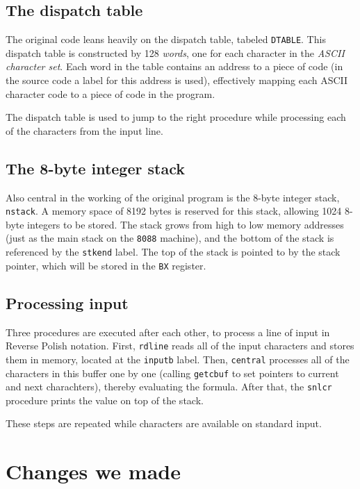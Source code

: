 \documentclass[11pt]{article}
\begin{document}
\subsection{The dispatch table}

The original code leans heavily on the dispatch table, tabeled \verb|DTABLE|. This dispatch table is constructed by 128 \emph{words}, one for each character in the \emph{ASCII character set}. Each word in the table contains an address to a piece of code (in the source code a label for this address is used), effectively mapping each ASCII character code to a piece of code in the program.

The dispatch table is used to jump to the right procedure while processing each of the characters from the input line.

\subsection{The 8-byte integer stack}

Also central in the working of the original program is the 8-byte integer stack, \verb|nstack|. A memory space of 8192 bytes is reserved for this stack, allowing 1024 8-byte integers to be stored. The stack grows from high to low memory addresses (just as the main stack on the \verb|8088| machine), and the bottom of the stack is referenced by the \verb|stkend| label. The top of the stack is pointed to by the stack pointer, which will be stored in the \verb|BX| register.

\subsection{Processing input}

Three procedures are executed after each other, to process a line of input in Reverse Polish notation. First, \verb|rdline| reads all of the input characters and stores them in memory, located at the \verb|inputb| label. Then, \verb|central| processes all of the characters in this buffer one by one (calling \verb|getcbuf| to set pointers to current and next charachters), thereby evaluating the formula. After that, the \verb|snlcr| procedure prints the value on top of the stack.

These steps are repeated while characters are available on standard input.


\section{Changes we made}
\end{document}
